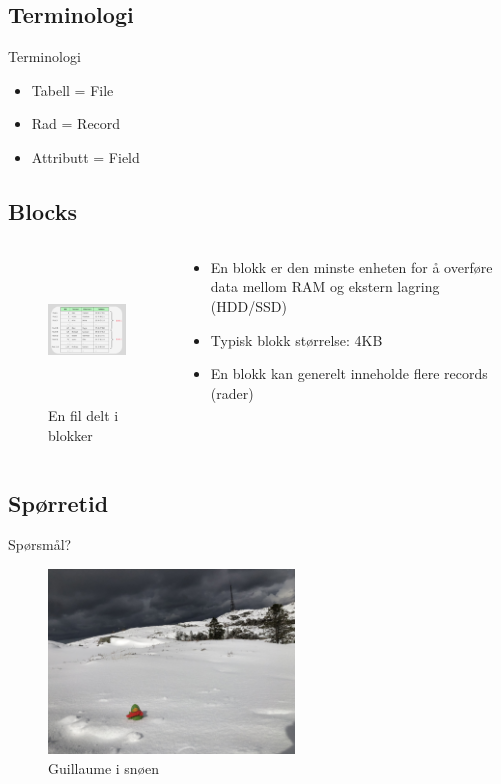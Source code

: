 \subsection*{Terminologi}
\begin{frame}{Terminologi}
  \begin{itemize}[<+->]
    \item Tabell   = File
    \item Rad      = Record
    \item Attributt = Field
  \end{itemize}
\end{frame}

\subsection*{Blocks}
\begin{frame}
  \begin{columns}
  \begin{column}{0.48\textwidth}
    \begin{figure}
        \includegraphics[height = 3.8cm]{images/blocks.png}
        \caption{En fil delt i blokker}
        \label{fig:blocks}
    \end{figure}
  \end{column}
  \begin{column}{0.48\textwidth}
    \begin{itemize}[<+->]
        \item En blokk er den minste enheten for å overføre data mellom RAM og ekstern lagring (HDD/SSD)
        \item Typisk blokk størrelse: 4KB
        \item En blokk kan generelt inneholde flere records (rader) 
    \end{itemize}
  \end{column}
  \end{columns}
\end{frame}

\subsection*{Spørretid}
\begin{frame}{Spørsmål?}
    \begin{figure}
        \centering
        \includegraphics[height = 4.9cm]{images/guillaume7.jpg}
        \caption{Guillaume i snøen}
        \label{fig:guillaume8}
    \end{figure}
\end{frame}

